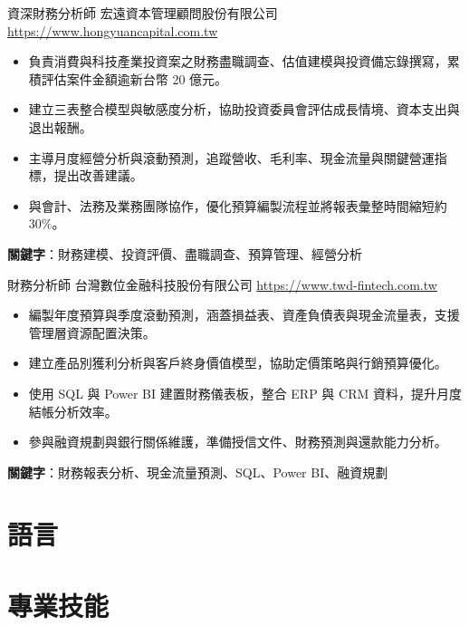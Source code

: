 \documentclass[a4paper, serif, 10pt]{moderncv}
\begin{document}
        {資深財務分析師}
        {宏遠資本管理顧問股份有限公司}
        {\url{https://www.hongyuancapital.com.tw}}
        {}
        {\begin{itemize}
\item 負責消費與科技產業投資案之財務盡職調查、估值建模與投資備忘錄撰寫，累積評估案件金額逾新台幣 20 億元。
\item 建立三表整合模型與敏感度分析，協助投資委員會評估成長情境、資本支出與退出報酬。
\item 主導月度經營分析與滾動預測，追蹤營收、毛利率、現金流量與關鍵營運指標，提出改善建議。
\item 與會計、法務及業務團隊協作，優化預算編製流程並將報表彙整時間縮短約 30\%。
\end{itemize}
\textbf{關鍵字}：財務建模、投資評價、盡職調查、預算管理、經營分析}

        {財務分析師}
        {台灣數位金融科技股份有限公司}
        {\url{https://www.twd-fintech.com.tw}}
        {}
        {\begin{itemize}
\item 編製年度預算與季度滾動預測，涵蓋損益表、資產負債表與現金流量表，支援管理層資源配置決策。
\item 建立產品別獲利分析與客戶終身價值模型，協助定價策略與行銷預算優化。
\item 使用 SQL 與 Power BI 建置財務儀表板，整合 ERP 與 CRM 資料，提升月度結帳分析效率。
\item 參與融資規劃與銀行關係維護，準備授信文件、財務預測與還款能力分析。
\end{itemize}
\textbf{關鍵字}：財務報表分析、現金流量預測、SQL、Power BI、融資規劃}
\section{語言}

\section{專業技能}

\end{document}
